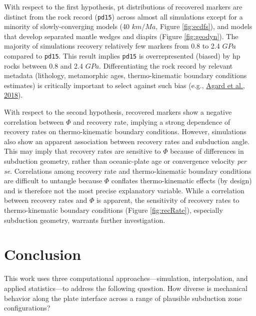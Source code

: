 With respect to the first hypothesis, \gls{pt} distributions of recovered markers are distinct from the rock record (\texttt{pd15}) across almost all simulations except for a minority of slowly-converging models (40 \(km/Ma\), Figure \ref{fig:ecdfs}), and models that develop separated mantle wedges and diapirs (Figure \ref{fig:geodyn}). The majority of simulations recovery relatively few markers from 0.8 to 2.4 \(GPa\) compared to \texttt{pd15}. This result implies \texttt{pd15} is overrepresented (biased) by \gls{hp} rocks between 0.8 and 2.4 \(GPa\). Differentiating the rock record by relevant metadata (lithology, metamorphic ages, thermo-kinematic boundary conditions estimates) is critically important to select against such bias (e.g., \protect\hyperlink{ref-agard2018}{Agard et al., 2018}).

With respect to the second hypothesis, recovered markers show a negative correlation between \(\Phi\) and recovery rate, implying a strong dependence of recovery rates on thermo-kinematic boundary conditions. However, simulations also show an apparent association between recovery rates and subduction angle. This may imply that recovery rates are sensitive to \(\Phi\) because of differences in subduction geometry, rather than oceanic-plate age or convergence velocity \emph{per se}. Correlations among recovery rate and thermo-kinematic boundary conditions are difficult to untangle because \(\Phi\) conflates thermo-kinematic effects (by design) and is therefore not the most precise explanatory variable. While a correlation between recovery rates and \(\Phi\) is apparent, the sensitivity of recovery rates to thermo-kinematic boundary conditions (Figure \ref{fig:recRate}), especially subduction geometry, warrants further investigation.

\cleardoublepage

\hypertarget{chpt5}{%
\chapter{Conclusion}\label{chpt5}}


This work uses three computational approaches---simulation, interpolation, and applied statistics---to address the following question. How diverse is mechanical behavior along the plate interface across a range of plausible subduction zone configurations?

